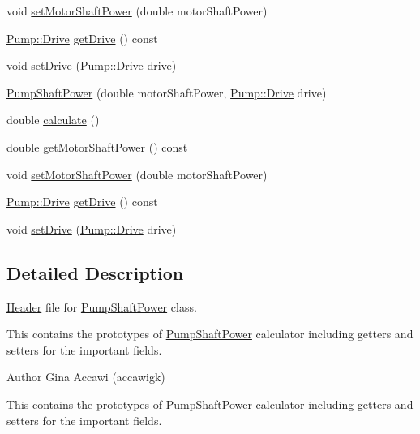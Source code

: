 \begin{DoxyCompactItemize}
void \hyperlink{class_pump_shaft_power_a77b8c621c7c92841dbd00112437c413b}{set\+Motor\+Shaft\+Power} (double motor\+Shaft\+Power)
\item 
\hyperlink{class_pump_a32bf0ade131a11bb3b3fb374f638e983}{Pump\+::\+Drive} \hyperlink{class_pump_shaft_power_a3d6529d7f5ce8ef194af9abe5e6399b6}{get\+Drive} () const
\item 
void \hyperlink{class_pump_shaft_power_a2c35a110c65c582a6f7d1d4c714f8187}{set\+Drive} (\hyperlink{class_pump_a32bf0ade131a11bb3b3fb374f638e983}{Pump\+::\+Drive} drive)
\item 
\hyperlink{class_pump_shaft_power_a84d04978ce410d544a4c8d9eb393c92d}{Pump\+Shaft\+Power} (double motor\+Shaft\+Power, \hyperlink{class_pump_a32bf0ade131a11bb3b3fb374f638e983}{Pump\+::\+Drive} drive)
\item 
double \hyperlink{class_pump_shaft_power_aad32bf26469a5f2984c85ba07c3f84d9}{calculate} ()
\item 
double \hyperlink{class_pump_shaft_power_acb91eadb960f946ffee5373d4839a5be}{get\+Motor\+Shaft\+Power} () const
\item 
void \hyperlink{class_pump_shaft_power_a77b8c621c7c92841dbd00112437c413b}{set\+Motor\+Shaft\+Power} (double motor\+Shaft\+Power)
\item 
\hyperlink{class_pump_a32bf0ade131a11bb3b3fb374f638e983}{Pump\+::\+Drive} \hyperlink{class_pump_shaft_power_a3d6529d7f5ce8ef194af9abe5e6399b6}{get\+Drive} () const
\item 
void \hyperlink{class_pump_shaft_power_a2c35a110c65c582a6f7d1d4c714f8187}{set\+Drive} (\hyperlink{class_pump_a32bf0ade131a11bb3b3fb374f638e983}{Pump\+::\+Drive} drive)
\end{DoxyCompactItemize}


\subsection{Detailed Description}
\hyperlink{class_header}{Header} file for \hyperlink{class_pump_shaft_power}{Pump\+Shaft\+Power} class. 

This contains the prototypes of \hyperlink{class_pump_shaft_power}{Pump\+Shaft\+Power} calculator including getters and setters for the important fields.

\begin{DoxyAuthor}{Author}
Gina Accawi (accawigk) 
\end{DoxyAuthor}


This contains the prototypes of \hyperlink{class_pump_shaft_power}{Pump\+Shaft\+Power} calculator including getters and setters for the important fields.

